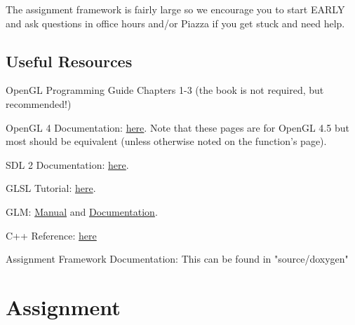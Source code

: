 \documentclass{article}
\begin{document}
The assignment framework is fairly large so we encourage you to start EARLY and ask questions in office hours and/or Piazza if you get stuck and need help.

\subsection*{Useful Resources}

\begin{enumerate*}
    \item OpenGL Programming Guide Chapters 1-3 (the book is not required, but recommended!)
    \item OpenGL 4 Documentation: \href{https://www.opengl.org/sdk/docs/man4/}{here}. Note that these pages are for OpenGL 4.5 but most should be equivalent (unless otherwise noted on the function's page).
    \item SDL 2 Documentation: \href{https://wiki.libsdl.org/CategoryAPI}{here}.
    \item GLSL Tutorial: \href{http://www.lighthouse3d.com/tutorials/glsl-tutorial/}{here}.
    \item GLM: \href{http://glm.g-truc.net/0.9.7/glm-0.9.7.pdf}{Manual} and \href{http://glm.g-truc.net/0.9.7/api/index.html}{Documentation}.
    \item C++ Reference: \href{http://en.cppreference.com/w/}{here}
    \item Assignment Framework Documentation: This can be found in "source/doxygen"
\end{enumerate*}

\section*{Assignment}
\end{document}
